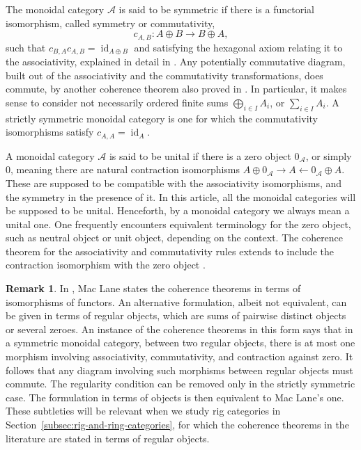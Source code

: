 \documentclass[JEP,XML,SOM,Unicode,published]{cedram}
\theoremstyle{plain}
\theoremstyle{definition}
\newtheorem{remark}[theorem]{Remark}
\newcommand{\Acal}{\mathcal A}
\DeclareMathOperator{\id}{id}
\begin{document}
The monoidal category $\Acal$ is said to be symmetric if there is a functorial isomorphism, called symmetry or commutativity,
\begin{displaymath}
c_{A,B}: A\oplus B \to B \oplus A,
\end{displaymath}
such that $c_{B,A}c_{A,B} = \id_{A\oplus B}$ and satisfying the hexagonal axiom relating it to the associativity, explained in detail in \cite[p.\,38]{MacLane}. Any potentially commutative diagram, built out of the associativity and the commutativity transformations, does commute, by another coherence theorem also proved in \cite[Th.\,4.2]{MacLane}. In particular, it makes sense to consider not necessarily ordered finite sums $\bigoplus_{i \in I} A_i$, or $\sum_{i\in I}A_{i}$. A strictly symmetric monoidal category is one for which the commutativity isomorphisms satisfy $c_{A,A}=\id_{A}$.

A monoidal category $\Acal$ is said to be unital if there is a zero object $0_{\Acal}$, or simply~$0$, meaning there are natural contraction isomorphisms $A\oplus 0_{\Acal} \rightarrow A \leftarrow 0_{\Acal} \oplus A$. These are supposed to be compatible with the associativity isomorphisms, and the symmetry in the presence of it. In this article, all the monoidal categories will be supposed to be unital. Henceforth, by a monoidal category we always mean a unital one. One frequently encounters equivalent terminology for the zero object, such as neutral object or unit object, depending on the context. The coherence theorem for the associativity and commutativity rules extends to include the contraction isomorphism with the zero object \cite[Th.\,5.1]{MacLane}.

\begin{remark}\label{rmk:Maclane-strict}
In \cite{MacLane}, Mac Lane states the coherence theorems in terms of isomorphisms of functors. An alternative formulation, albeit not equivalent, can be given in terms of regular objects, \ie which are sums of pairwise distinct objects or several zeroes. An instance of the coherence theorems in this form says that in a symmetric monoidal category, between two regular objects, there is at most one morphism involving associativity, commutativity, and contraction against zero. It follows that any diagram involving such morphisms between regular objects must commute. The regularity condition can be removed only in the strictly symmetric case. The formulation in terms of objects is then equivalent to Mac Lane's one. These subtleties will be relevant when we study rig categories in Section~\ref{subsec:rig-and-ring-categories}, for which the coherence theorems in the literature are stated in terms of regular objects.
\end{remark}
\end{document}
